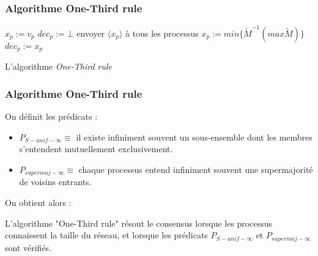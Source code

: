 \documentclass{beamer}
\begin{document}
\begin{frame}
\frametitle{Algorithme One-Third rule}
\begin{algorithm}[H]
\scriptsize
\begin{distribalgo}[1]
\BLANK
{}
	\STATE $x_p := v_p$ 
	\STATE $dec_p := \bot$ 
\ENDINDENT
\BLANK
{}
		\STATE envoyer $\langle x_p \rangle$ à tous les processus
	\ENDINDENT
	\BLANK
			\STATE $x_p := min \{\widetilde{M}^{-1} (max \widetilde{M})\}$ 
				\STATE $dec_p := x_p$ 
			\ENDIF
		\ENDIF
	\ENDINDENT
\ENDINDENT \BLANK
\caption{L'algorithme {\em One-Third rule}} \label{algo:R}
\end{distribalgo}
\end{algorithm}
\end{frame}

\begin{frame}
\frametitle{Algorithme One-Third rule}
On définit les prédicats :
\begin{itemize}
	\item $P_{S-unif-\infty} \equiv$ il existe infiniment souvent un sous-ensemble dont les membres s'entendent mutuellement exclusivement.
	\item $P_{supermaj-\infty} \equiv$ chaque processus entend infiniment souvent une supermajorité de voisins entrants.
\end{itemize}
On obtient alors :
\begin{theorem}
	L'algorithme "One-Third rule" résout  le consensus lorsque les processus connaissent la taille du réseau,
	et lorsque les prédicats $P_{S-unif-\infty}$ et $P_{supermaj-\infty}$ sont vérifiés.
\end{theorem}
\end{frame}
\end{document}
